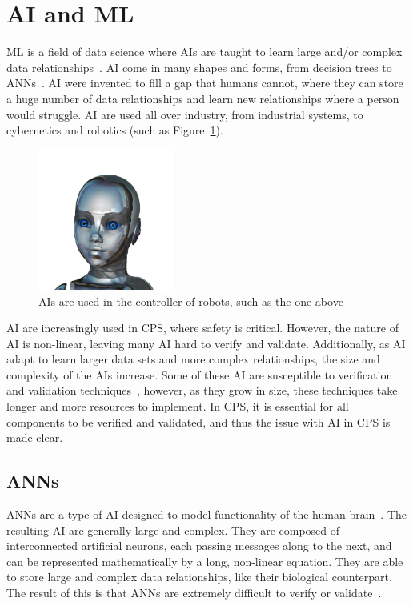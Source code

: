 \section{\acf{AI} and \acf{ML}}
\acf{ML} is a field of data science where \acfp{AI} are taught to learn large and/or complex data relationships~\cite{ai}.
\ac{AI} come in many shapes and forms, from decision trees to \acfp{ANN}~\cite{ai-types}.
\ac{AI} were invented to fill a gap that humans cannot, where they can store a huge number of data relationships and learn new relationships where a person would struggle.
\ac{AI} are used all over industry, from industrial systems, to cybernetics and robotics (such as Figure~\ref{fig:ai-girl}).

\begin{figure}[h]
	\centering
	\includegraphics[width=0.4\textwidth]{Content/fig/ai-girl.png}
	\caption{\acp{AI} are used in the controller of robots, such as the one above~\cite{robotgirl-pic} \label{fig:ai-girl}}
\end{figure}

\ac{AI} are increasingly used in \ac{CPS}, where safety is critical.
However, the nature of \ac{AI} is non-linear, leaving many \ac{AI} hard to verify and validate.
Additionally, as \ac{AI} adapt to learn larger data sets and more complex relationships, the size and complexity of the \acp{AI} increase.
Some of these \ac{AI} are susceptible to verification and validation techniques~\cite{aiverify}, however, as they grow in size, these techniques take longer and more resources to implement.
In \ac{CPS}, it is essential for all components to be verified and validated, and thus the issue with \ac{AI} in \ac{CPS} is made clear.

\subsection{\acfp{ANN}}
\acp{ANN} are a type of \ac{AI} designed to model functionality of the human brain~\cite{kohonen1988introduction}.
The resulting \ac{AI} are generally large and complex.
They are composed of interconnected artificial neurons, each passing messages along to the next, and can be represented mathematically by a long, non-linear equation.
They are able to store large and complex data relationships, like their biological counterpart.
The result of this is that \acp{ANN} are extremely difficult to verify or validate~\cite{menzies2005verification}.

